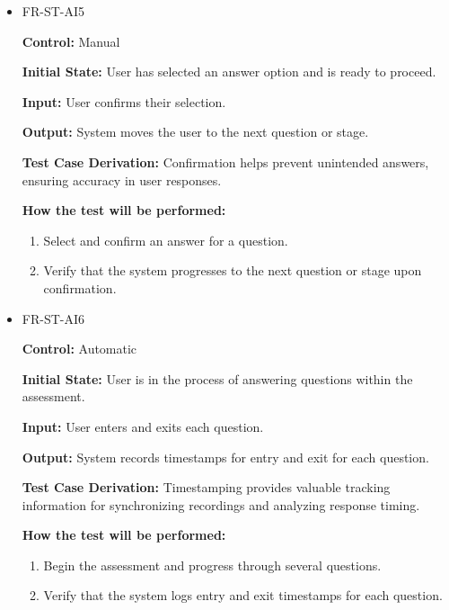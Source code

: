 \documentclass[12pt, titlepage]{article}
\begin{document}
\begin{itemize}
  \item FR-ST-AI5
    \begin{mdframed}[linewidth=0.5mm]
      \textbf{Control:} Manual \par
      \textbf{Initial State:} User has selected an answer option and is ready to proceed. \par
      \textbf{Input:} User confirms their selection. \par
      \textbf{Output:} System moves the user to the next question or stage. \par
      \textbf{Test Case Derivation:} Confirmation helps prevent unintended answers, ensuring accuracy in user responses. \par
      \textbf{How the test will be performed:}
      \begin{enumerate}[noitemsep]
        \item Select and confirm an answer for a question.
        \item Verify that the system progresses to the next question or stage upon confirmation.
      \end{enumerate}
    \end{mdframed}

  \item FR-ST-AI6
    \begin{mdframed}[linewidth=0.5mm]
      \textbf{Control:} Automatic \par
      \textbf{Initial State:} User is in the process of answering questions within the assessment. \par
      \textbf{Input:} User enters and exits each question. \par
      \textbf{Output:} System records timestamps for entry and exit for each question. \par
      \textbf{Test Case Derivation:} Timestamping provides valuable tracking information for synchronizing recordings and analyzing response timing. \par
      \textbf{How the test will be performed:}
      \begin{enumerate}[noitemsep]
        \item Begin the assessment and progress through several questions.
        \item Verify that the system logs entry and exit timestamps for each question.
      \end{enumerate}
    \end{mdframed}


\end{itemize}
\end{document}
